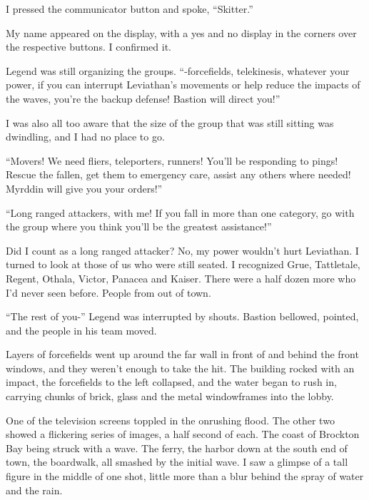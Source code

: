 I pressed the communicator button and spoke, ``Skitter.''



My name appeared on the display, with a yes and no display in the corners over the respective buttons.  I confirmed it.



Legend was still organizing the groups.  ``-forcefields, telekinesis, whatever your power, if you can interrupt Leviathan's movements or help reduce the impacts of the waves, you're the backup defense!  Bastion will direct you!''



I was also all too aware that the size of the group that was still sitting was dwindling, and I had no place to go.



``Movers!  We need fliers, teleporters, runners!  You'll be responding to pings!  Rescue the fallen, get them to emergency care, assist any others where needed!  Myrddin will give you your orders!''



``Long ranged attackers, with me!  If you fall in more than one category, go with the group where you think you'll be the greatest assistance!''



Did I count as a long ranged attacker?  No, my power wouldn't hurt Leviathan.  I turned to look at those of us who were still seated.  I recognized Grue, Tattletale, Regent, Othala, Victor, Panacea and Kaiser.  There were a half dozen more who I'd never seen before.  People from out of town.



``The rest of you-'' Legend was interrupted by shouts.  Bastion bellowed, pointed, and the people in his team moved.



Layers of forcefields went up around the far wall in front of and behind the front windows, and they weren't enough to take the hit.  The building rocked with an impact, the forcefields to the left collapsed, and the water began to rush in, carrying chunks of brick, glass and the metal windowframes into the lobby.



One of the television screens toppled in the onrushing flood.  The other two showed a flickering series of images, a half second of each.  The coast of Brockton Bay being struck with a wave.  The ferry, the harbor down at the south end of town, the boardwalk, all smashed by the initial wave.  I saw a glimpse of a tall figure in the middle of one shot, little more than a blur behind the spray of water and the rain.



